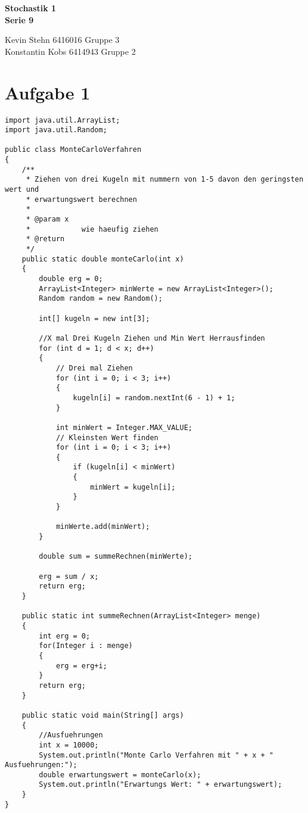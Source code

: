 \documentclass[10pt,a4paper]{article}
\begin{document}
\begin{center}
\textbf{Stochastik 1 \\ Serie 9 \\}
\end{center}

\begin{flushright}
Kevin Stehn 6416016 Gruppe 3 \\
Konstantin Kobs 6414943 Gruppe 2
\end{flushright}

\section*{Aufgabe 1}
\begin{lstlisting}
import java.util.ArrayList;
import java.util.Random;

public class MonteCarloVerfahren
{
	/**
	 * Ziehen von drei Kugeln mit nummern von 1-5 davon den geringsten wert und
	 * erwartungswert berechnen
	 * 
	 * @param x
	 *            wie haeufig ziehen
	 * @return
	 */
	public static double monteCarlo(int x)
	{
		double erg = 0;
		ArrayList<Integer> minWerte = new ArrayList<Integer>();
		Random random = new Random();
		
		int[] kugeln = new int[3];
		
		//X mal Drei Kugeln Ziehen und Min Wert Herrausfinden
		for (int d = 1; d < x; d++)
		{
			// Drei mal Ziehen
			for (int i = 0; i < 3; i++)
			{
				kugeln[i] = random.nextInt(6 - 1) + 1;
			}

			int minWert = Integer.MAX_VALUE;
			// Kleinsten Wert finden
			for (int i = 0; i < 3; i++)
			{
				if (kugeln[i] < minWert)
				{
					minWert = kugeln[i];
				}
			}
			
			minWerte.add(minWert);
		}
		
		double sum = summeRechnen(minWerte);
		
		erg = sum / x;
		return erg;
	}
	
	public static int summeRechnen(ArrayList<Integer> menge)
	{
		int erg = 0;
		for(Integer i : menge)
		{
			erg = erg+i;
		}
		return erg;
	}

	public static void main(String[] args)
	{
		//Ausfuehrungen
		int x = 10000;
		System.out.println("Monte Carlo Verfahren mit " + x + " Ausfuehrungen:");
		double erwartungswert = monteCarlo(x);
		System.out.println("Erwartungs Wert: " + erwartungswert);
	}
}

\end{lstlisting}
\end{document}
